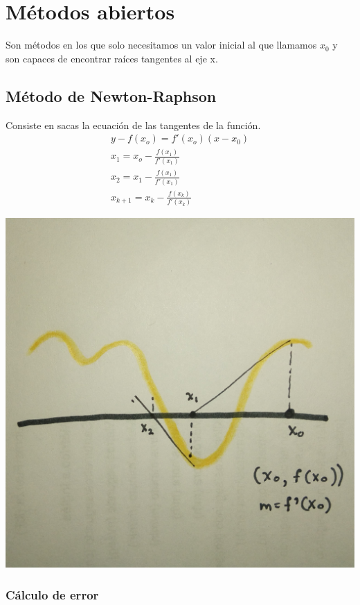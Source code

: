 
\section{M\'etodos abiertos}
Son m\'etodos en los que solo necesitamos un valor inicial al que llamamos $x_0$ y son capaces de encontrar ra\'ices tangentes al eje x.

\subsection{M\'etodo de Newton-Raphson}
Consiste en sacas la ecuaci\'on de las tangentes de la funci\'on.
\begin{gather}
y-f(x_o)=f'(x_o)(x-x_0) \\
x_1=x_o-\frac{f(x_1)}{f'(x_1)} \\
x_2=x_1-\frac{f(x_1)}{f'(x_1)} \\
\boxed{x_{k+1}=x_k-\frac{f(x_k)}{f'(x_k)}}
\end{gather}
\begin{center}
\includegraphics[scale=.05]{imagenes/3.jpg}
\end{center}
\subsubsection*{C\'alculo de error}

